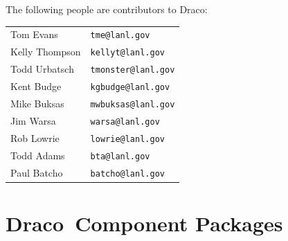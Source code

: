 \documentclass[note]{ResearchNote_pdf}
\newcommand{\draco}{Draco}
\begin{document}
The following people are contributors to \draco:
\begin{center}
  \begin{tabular}{ll}
    Tom Evans & \texttt{tme@lanl.gov} \\
    Kelly Thompson & \texttt{kellyt@lanl.gov} \\
    Todd Urbatsch & \texttt{tmonster@lanl.gov} \\
    Kent Budge & \texttt{kgbudge@lanl.gov} \\
    Mike Buksas & \texttt{mwbuksas@lanl.gov} \\
    Jim Warsa & \texttt{warsa@lanl.gov} \\
    Rob Lowrie & \texttt{lowrie@lanl.gov} \\
    Todd Adams & \texttt{bta@lanl.gov} \\
    Paul Batcho & \texttt{batcho@lanl.gov} \\
  \end{tabular}
\end{center}


\section{\draco\ Component Packages}
\end{document}
